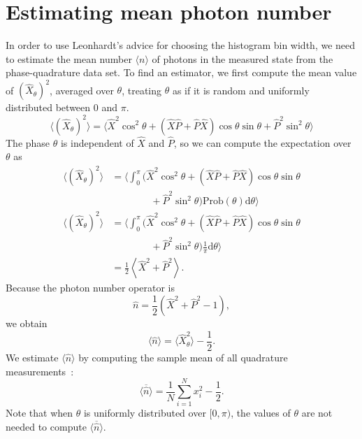 \documentclass[
reprint,
superscriptaddress,
showpacs,
amsmath,
amssymb,
aps,
pra,
longbibliography
]{revtex4-1}
\providecommand{\editcolor}[2]{\textcolor{#1}{#2}}
\providecommand{\editcolor}[2]{#2}
\newcommand{\HV}[1]{\editcolor{blue}{#1}}
\begin{document}
\section{Estimating mean photon number}
\label{sec-photon-estimation}
In order to use Leonhardt's advice for choosing the
histogram bin width, we need to estimate the mean number
$\langle n \rangle$ of photons in the measured state from the
phase-quadrature data set. To find an estimator, we first compute the
mean value of $(\hat{X}_{\theta})^{2}$, averaged over $\theta$,
treating $\theta$ as if it is random and uniformly distributed between
$0$ and $\pi$.
\begin{equation}
  \langle (\hat{X}_{\theta})^{2} \rangle = \langle \hat{X}^{2}\cos^{2}\theta + (\hat{X}\hat{P}+\hat{P}\hat{X})\cos\theta\sin\theta + \hat{P}^{2}\sin^{2}\theta \rangle
\end{equation}
The phase $\theta$ is independent of $\hat{X}$ and $\hat{P}$, so we
can compute the expectation over $\theta$ as
\begin{align}
  \langle (\hat{X}_{\theta})^{2} \rangle &= \Big\langle \int_{0}^{\pi} (\hat{X}^{2}\cos^{2}\theta + (\hat{X}\hat{P}+\hat{P}\hat{X})\cos\theta\sin\theta \nonumber \\
                                         & \qquad \qquad + \hat{P}^{2}\sin^{2}\theta) \mathrm{Prob}(\theta) \mathrm{d}\theta \Big\rangle \\
  \langle (\hat{X}_{\theta})^{2} \rangle &= \Big\langle \int_{0}^{\pi} (\hat{X}^{2}\cos^{2}\theta + (\hat{X}\hat{P}+\hat{P}\hat{X})\cos\theta\sin\theta \nonumber \\
                                         & \qquad \qquad + \hat{P}^{2}\sin^{2}\theta) \frac{1}{\pi} \mathrm{d}\theta \Big\rangle \\
                                         &= \frac{1}{2}\left\langle \hat{X}^{2} + \hat{P}^{2} \right\rangle.
\end{align}
Because the photon number operator is
\begin{equation}
  \hat{n} = \frac{1}{2}\left(\hat{X}^{2}+\hat{P}^{2}-1\right),
\end{equation}
we obtain
\begin{equation}
  \langle\hat{n}\rangle = \langle \hat{X}_{\theta}^{2}\rangle-\frac{1}{2}. 
\end{equation}
We estimate $\langle \hat{n} \rangle$ by computing the sample
mean of all quadrature measurements~\HV{\cite{Hradil2,Munroe1996}}:
\begin{equation}
  \overline{\langle \hat{n} \rangle} = \frac{1}{N} \sum_{i=1}^{N}x_{i}^{2} - \frac{1}{2}.
  \label{eq-photon-estimation}
\end{equation}
Note that when $\theta$ is uniformly distributed over $[0,\pi)$, the
values of $\theta$ are not needed to compute
$\overline{\langle \hat{n} \rangle}$.  
\end{document}
